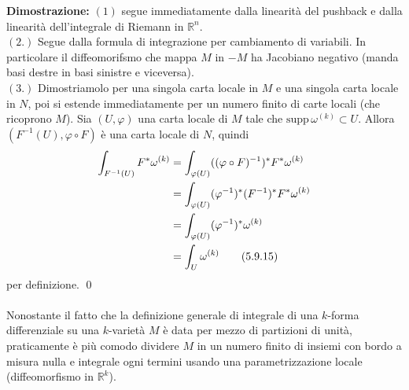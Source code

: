\documentclass{article}
\begin{document}
\textbf{Dimostrazione:} $(1)$ segue immediatamente dalla linearità del pushback e dalla linearità dell'integrale di Riemann in $\mathbb{R}^n$. \\
$(2.)$ Segue dalla formula di integrazione per cambiamento di variabili. In particolare il diffeomorifsmo che mappa $M$ in $-M$ ha Jacobiano negativo (manda basi destre in basi sinistre e viceversa). \\
$(3.)$ Dimostriamolo per una singola carta locale in $M$ e una singola carta locale in $N$, poi si estende immediatamente per un numero finito di carte locali (che ricoprono $M$). Sia $(U, \varphi)$ una carta locale di $M$ tale che $\mathrm{supp} \, \omega^{(k)} \subset U$. Allora $(F^{-1}(U), \varphi \circ F)$ è una carta locale di $N$, quindi
\begin{align}
    \int_{F^{-1}(U)} F^*\omega^{(k)} &= \int_{\varphi(U)} ((\varphi \circ F)^{-1})^*F^*\omega^{(k)} \notag \\
    &= \int_{\varphi(U)} (\varphi^{-1})^*(F^{-1})^*F^*\omega^{(k)} \notag \\
    &= \int_{\varphi(U)} (\varphi^{-1})^*\omega^{(k)} \notag \\
    &= \int_U \omega^{(k)} \tag{5.9.15}
\end{align}
per definizione. \qed \\ \\
Nonostante il fatto che la definizione generale di integrale di una $k$-forma differenziale su una $k$-varietà $M$ è data per mezzo di partizioni di unità, praticamente è più comodo dividere $M$ in un numero finito di insiemi con bordo a misura nulla e integrale ogni termini usando una parametrizzazione locale (diffeomorfismo in $\mathbb{R}^k$).

\newpage
\end{document}
